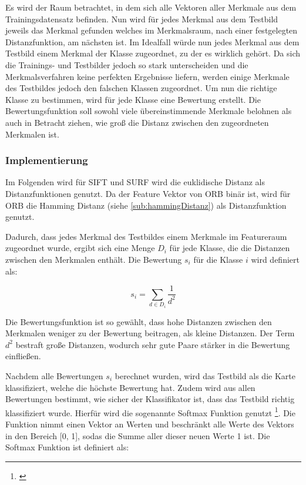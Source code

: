 Es wird der Raum betrachtet, in dem sich alle Vektoren aller Merkmale aus dem Trainingsdatensatz befinden. Nun wird für jedes Merkmal aus dem Testbild jeweils das Merkmal gefunden welches im Merkmalsraum, nach einer festgelegten Distanzfunktion, am nächsten ist.
Im Idealfall würde nun jedes Merkmal aus dem Testbild einem Merkmal der Klasse zugeordnet, zu der es wirklich gehört. Da sich die Trainings- und Testbilder jedoch so stark unterscheiden und die Merkmalsverfahren keine perfekten Ergebnisse liefern, werden einige Merkmale des Testbildes jedoch den falschen Klassen zugeordnet.
Um nun die richtige Klasse zu bestimmen, wird für jede Klasse eine Bewertung erstellt. Die Bewertungsfunktion soll sowohl viele übereinstimmende Merkmale belohnen als auch in Betracht ziehen, wie groß die Distanz zwischen den zugeordneten Merkmalen ist.


\subsubsection{Implementierung}

Im Folgenden wird für SIFT und SURF wird die euklidische Distanz als Distanzfunktionen genutzt. Da der Feature Vektor von ORB binär ist, wird für ORB die Hamming Distanz (siehe \ref{sub:hammingDistanz}) als Distanzfunktion genutzt.

Dadurch, dass jedes Merkmal des Testbildes einem Merkmale im Featureraum zugeordnet wurde, ergibt sich eine Menge $D_i$ für jede Klasse, die die Distanzen zwischen den Merkmalen enthält.
Die Bewertung $s_i$ für die Klasse $i$ wird definiert als: 

\[
s_i = \sum_{d \in D_i} \frac{1}{d^2}
\]

Die Bewertungsfunktion ist so gewählt, dass hohe Distanzen zwischen den Merkmalen weniger zu der Bewertung beitragen, als kleine Distanzen. Der Term $d^2$ bestraft große Distanzen, wodurch sehr gute Paare stärker in die Bewertung einfließen.

Nachdem alle Bewertungen $s_i$ berechnet wurden, wird das Testbild als die Karte klassifiziert, welche die höchste Bewertung hat.
Zudem wird aus allen Bewertungen bestimmt, wie sicher der Klassifikator ist, dass das Testbild richtig klassifiziert wurde.
Hierfür wird die sogenannte Softmax Funktion genutzt \footnote{\cite{Bishop:2006:PRM:1162264}}. Die Funktion nimmt einen Vektor an Werten und beschränkt alle Werte des Vektors in den Bereich [0, 1], sodas die Summe aller dieser neuen Werte 1 ist. Die Softmax Funktion ist definiert als:

